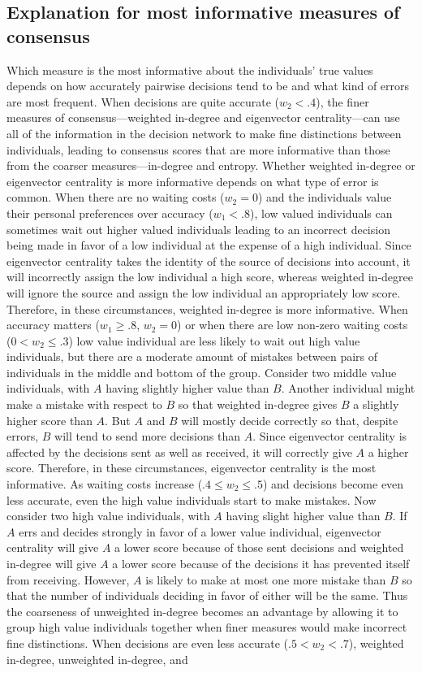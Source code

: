 \documentclass{article}
\begin{document}
\subsection{Explanation for most informative measures of consensus }

Which measure is the most informative about the individuals' true values depends on how accurately pairwise decisions tend to be and what kind of errors are most frequent. When decisions are quite accurate ($w_2<.4$), the finer measures of consensus---weighted in-degree and eigenvector centrality---can use all of the information in the decision network to make fine distinctions between individuals, leading to consensus scores that are more informative than those from the coarser measures---in-degree and entropy.  Whether weighted in-degree or eigenvector centrality is more informative depends on what type of error is common. When there are no waiting costs ($w_2=0$) and the individuals value their personal preferences over accuracy ($w_1<.8$), low valued individuals can sometimes wait out higher valued individuals leading to an incorrect  decision being made in favor of a low individual at the expense of a high individual. Since eigenvector centrality takes the identity of the source of decisions into account, it will incorrectly assign the low individual a high score, whereas weighted in-degree will ignore the source and assign the low individual an appropriately low score.  Therefore, in these circumstances, weighted in-degree is more informative. When accuracy matters ($w_1\geq .8$, $w_2=0$) or when there are low non-zero waiting costs ($0<w_2\leq .3$) low value individual are less likely to wait out high value individuals, but there are a moderate amount of mistakes between pairs of individuals in the middle and bottom of the group. Consider two middle value individuals, with $A$ having slightly higher value than $B$. Another individual might make a mistake with respect to $B$ so that weighted in-degree gives $B$ a slightly higher score than $A$. But $A$ and $B$ will mostly decide correctly so that, despite errors, $B$ will tend to send more decisions than $A$. Since eigenvector centrality is affected by the decisions sent as well as received, it will correctly give $A$ a higher score. Therefore, in these circumstances, eigenvector centrality is the most informative. As waiting costs increase ($.4 \leq w_2 \leq .5$) and decisions become even less accurate, even the high value individuals start to make mistakes. Now consider two high value individuals, with $A$ having slight higher value than $B$. If $A$ errs and decides strongly in favor of a lower value individual, eigenvector centrality will give $A$ a lower score because of those sent decisions and weighted in-degree will give $A$ a lower score because of the decisions it has prevented itself from receiving. However, $A$ is likely to make at most one more mistake than $B$ so that the number of individuals deciding in favor of either will be the same. Thus the coarseness of unweighted in-degree becomes an advantage by allowing it to group high value individuals together when finer measures would make incorrect fine distinctions. When decisions are even less accurate ($.5<w_2<.7$), weighted in-degree, unweighted in-degree, and 
\end{document}
